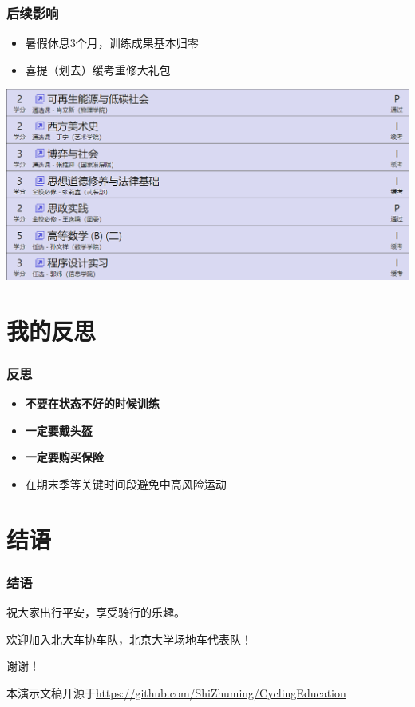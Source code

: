 \documentclass[12pt,AutoFakeBold]{beamer}
\begin{document}
    \begin{frame}
        \frametitle{后续影响}
        \begin{itemize}
            \item 暑假休息3个月，训练成果基本归零
            \item 喜提（划去）缓考重修大礼包
        \end{itemize}
        \begin{center}
            \includegraphics[width=0.618\paperwidth]{figures/result.png}    
        \end{center}
        
    \end{frame}

    \section{我的反思}
    \begin{frame}
        \frametitle{反思}
        \begin{itemize}
            \item \textbf{不要在状态不好的时候训练}
            \item \textbf{一定要戴头盔}
            \item \textbf{一定要购买保险}
            \item 在期末季等关键时间段避免中高风险运动
        \end{itemize}
    \end{frame}

    \section{结语}
    \begin{frame}
        \frametitle{结语}
        祝大家出行平安，享受骑行的乐趣。

        欢迎加入北大车协车队，北京大学场地车代表队！

        谢谢！

        本演示文稿开源于\href{https://github.com/ShiZhuming/CyclingEducation}{https://github.com/ShiZhuming/CyclingEducation}
    \end{frame}
\end{document}
